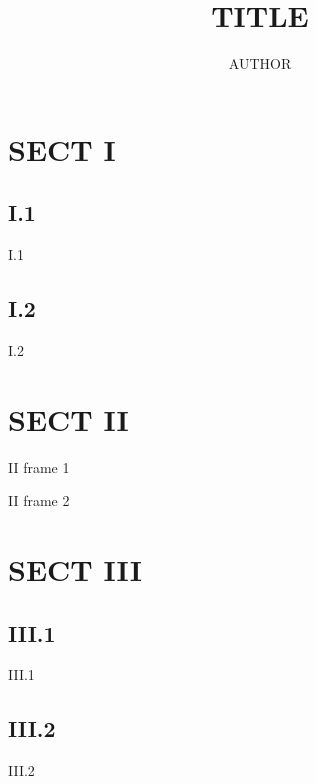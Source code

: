\documentclass{beamer}
\title{TITLE}
\author{AUTHOR}
\begin{document}
\begin{frame}\maketitle\end{frame}

\section{SECT I}
\subsection{I.1}
\begin{frame}I.1\end{frame}

\subsection{I.2}
\begin{frame}I.2\end{frame}

\section{SECT II}
\begin{frame}II frame 1\end{frame}
\begin{frame}II frame 2\end{frame}

\section{SECT III}
\subsection{III.1}
\begin{frame}III.1\end{frame}

\subsection{III.2}
\begin{frame}III.2\end{frame}
\end{document}
